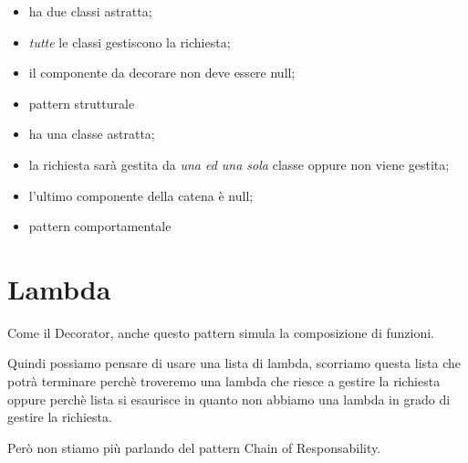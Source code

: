 \begin{multicols}{2}
    \begin{itemize}
        \item [] ha due classi astratta;
        \item [] \textit{tutte} le classi gestiscono la richiesta;
        \item [] il componente da decorare non deve essere null;
        \item [] pattern strutturale
    \end{itemize}
\columnbreak
    \begin{itemize}
        \item [] ha una classe astratta;
        \item [] la richiesta sarà gestita da \textit{una ed una sola} classe oppure non viene gestita;
        \item [] l'ultimo componente della catena è null;
        \item [] pattern comportamentale
    \end{itemize}
\end{multicols}

\section{Lambda}

Come il Decorator, anche questo pattern simula la composizione di funzioni.

Quindi possiamo pensare di usare una lista di lambda, scorriamo questa lista che potrà terminare perchè troveremo una lambda che riesce a gestire la richiesta oppure 
perchè lista si esaurisce in quanto non abbiamo una lambda in grado di gestire la richiesta.

Però non stiamo più parlando del pattern Chain of Responsability.
